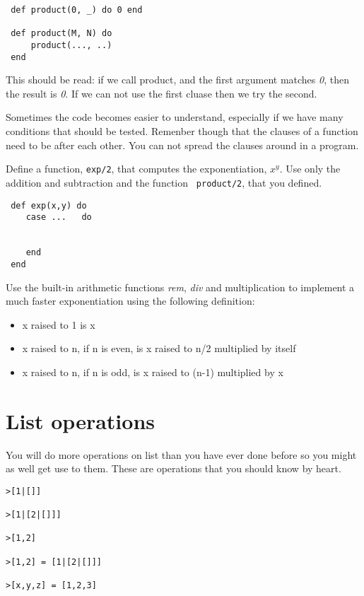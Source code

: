 \documentclass[a4paper,11pt]{article}
\begin{document}
{\begin{verbatim}
 def product(0, _) do 0 end

 def product(M, N) do 
     product(..., ..)
 end
\end{verbatim}

This should be read: if we call product, and the first argument
matches {\em 0}, then the result is {\em 0}. If we can not use the
first cluase then we try the second.

Sometimes the code becomes easier to understand, especially if we have
many conditions that should be tested. Remenber though that the
clauses of a function need to be after each other. You can not spread
the clauses around in a program.


Define a function, {\tt exp/2}, that computes the exponentiation,
$x^y$. Use only the addition and subtraction and the function {\tt
  product/2}, that you defined.

\begin{verbatim}
 def exp(x,y) do 
    case ...   do

 
    end
 end
\end{verbatim}

Use the built-in arithmetic functions {\em rem}, {\em div} and
multiplication {\em *} to implement a much faster exponentiation using
the following definition:

\begin{itemize}
  \item x raised to 1 is x
  \item x raised to n, if n is even, is x raised to n/2 multiplied by itself
  \item x raised to n, if n is odd, is x raised to (n-1) multiplied by x
\end{itemize}


\section{List operations}

You will do more operations on list than you have ever done before so
you might as well get use to them. These are operations that you should
know by heart.

\begin{verbatim}
>[1|[]]

>[1|[2|[]]]

>[1,2]

>[1,2] = [1|[2|[]]]

>[x,y,z] = [1,2,3]


\end{verbatim}}
\end{document}
